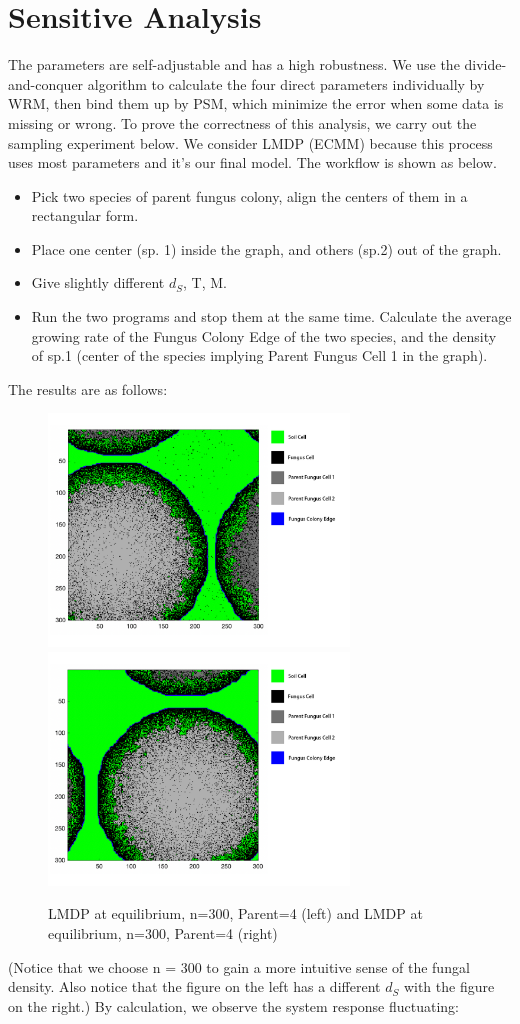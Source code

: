 \documentclass[12pt]{article}
\begin{document}
\section{Sensitive Analysis}\label{condition}
The parameters are self-adjustable and has a high robustness. We use the divide-and-conquer algorithm to calculate the four direct parameters individually by WRM, then bind them up by PSM, which minimize the error when some data is missing or wrong. To prove the correctness of this analysis, we carry out the sampling experiment below.
We consider LMDP (ECMM) because this process uses most parameters and it’s our final model. The workflow is shown as below.
\begin{itemize}
\item Pick two species of parent fungus colony, align the centers of them in a rectangular form.
\item Place one center (sp. 1) inside the graph, and others (sp.2) out of the graph.
\item Give slightly different $d_S$, T, M. 
\item Run the two programs and stop them at the same time. Calculate the average growing rate of the Fungus Colony Edge of the two species, and the density of sp.1 (center of the species implying Parent Fungus Cell 1 in the graph).
\end{itemize}
The results are as follows:
\begin{figure}[H]
	\small
	\centering
	\includegraphics[width=8cm]{./pictures/1.png}
	\includegraphics[width=8cm]{./pictures/2.png}
	\caption{LMDP at equilibrium, n=300, Parent=4 (left) and LMDP at equilibrium, n=300, Parent=4 (right)}\label{nt}
\end{figure}
(Notice that we choose n = 300 to gain a more intuitive sense of the fungal density. Also notice that the figure on the left has a different $d_S$ with the figure on the right.)
By calculation, we observe the system response fluctuating:
\end{document}
